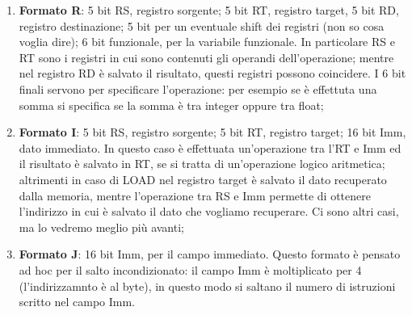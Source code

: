 \documentclass{article}
\begin{document}
\begin{enumerate}
	\item \textbf{Formato R}: 5 bit RS, registro sorgente; 5 bit RT, registro target, 5 bit RD, registro destinazione; 5 bit per un eventuale shift dei registri (non so cosa voglia dire); 6 bit funzionale, per la variabile funzionale. In particolare RS e RT sono i registri in cui sono contenuti gli operandi dell'operazione; mentre nel registro RD è salvato il risultato, questi registri possono coincidere. I 6 bit finali servono per specificare l'operazione: per esempio se è effettuta una somma si specifica se la somma è tra integer oppure tra float;

	\item \textbf{Formato I}: 5 bit RS, registro sorgente; 5 bit RT, registro target; 16 bit Imm, dato immediato. In questo caso è effettuata un'operazione tra l'RT e Imm ed il risultato è salvato in RT, se si tratta di un'operazione logico aritmetica; altrimenti in caso di LOAD nel registro target è salvato il dato recuperato dalla memoria, mentre l'operazione tra RS e Imm permette di ottenere l'indirizzo in cui è salvato il dato che vogliamo recuperare. Ci sono altri casi, ma lo vedremo meglio più avanti;

	\item \textbf{Formato J}: 16 bit Imm, per il campo immediato. Questo formato è pensato ad hoc per il salto incondizionato: il campo Imm è moltiplicato per 4 (l'indirizzamnto è al byte), in questo modo si saltano il numero di istruzioni scritto nel campo Imm.
\end{enumerate}
\end{document}
